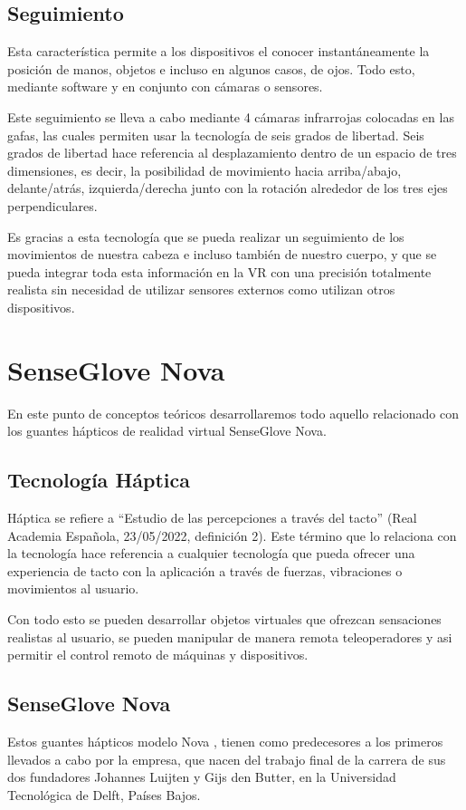 \subsection{Seguimiento}
Esta característica permite a los dispositivos el conocer instantáneamente la posición de manos, objetos e incluso en algunos casos, de ojos. Todo esto, mediante software y en conjunto con cámaras o sensores.

Este seguimiento se lleva a cabo mediante 4 cámaras infrarrojas colocadas en las gafas, las cuales permiten usar la tecnología de seis grados de libertad\cite{6Grados}. Seis grados de libertad hace referencia al desplazamiento dentro de un espacio de tres dimensiones, es decir, la posibilidad de movimiento hacia arriba/abajo, delante/atrás, izquierda/derecha junto con la rotación alrededor de los tres ejes perpendiculares.

Es gracias a esta tecnología que se pueda realizar un seguimiento de los movimientos de nuestra cabeza e incluso también de nuestro cuerpo, y que se pueda integrar toda esta información en la VR con una precisión totalmente realista sin necesidad de utilizar sensores externos como utilizan otros dispositivos.

\newpage

\section{SenseGlove Nova}
En este punto de conceptos teóricos desarrollaremos todo aquello relacionado con los guantes hápticos de realidad virtual SenseGlove Nova.

\subsection{Tecnología Háptica}
Háptica se refiere a “Estudio de las percepciones a través del tacto” (Real Academia Española, 23/05/2022, definición 2). Este término que lo relaciona con la tecnología hace referencia a cualquier tecnología que pueda ofrecer una experiencia de tacto con la aplicación a través de fuerzas, vibraciones o movimientos al usuario.

Con todo esto se pueden desarrollar objetos virtuales que ofrezcan sensaciones realistas al usuario, se pueden manipular de manera remota teleoperadores y asi permitir el control remoto de máquinas y dispositivos. 

\subsection{SenseGlove Nova}
 Estos guantes hápticos modelo Nova \cite{SGloveNova}, tienen como predecesores a los primeros llevados a cabo por la empresa, que nacen del trabajo final de la carrera de sus dos fundadores Johannes Luijten y Gijs den Butter, en la Universidad Tecnológica de Delft, Países Bajos.
 
